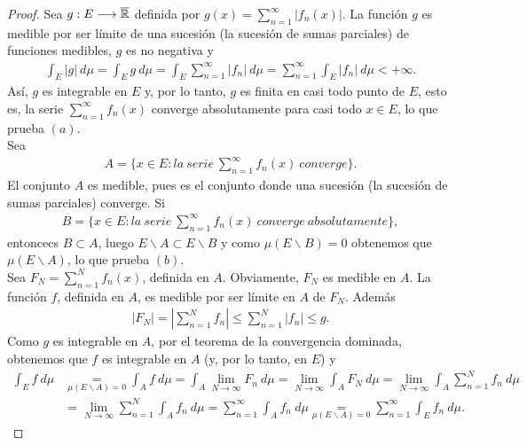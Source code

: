 \begin{proof}
Sea $g: E \longrightarrow \overline{\mathbb{R}}$ definida por $g(x) = \sum_{n=1}^{\infty}{|f_n(x)|}$. La función $g$ es medible por ser límite de una sucesión (la sucesión de sumas parciales) de funciones medibles, $g$ es no negativa y
\begin{align*}
    \int_{E}{|g| \ d\mu} = \int_{E}{g \ d\mu} = \int_{E}{\sum_{n=1}^{\infty}{|f_n|} \ d\mu} =  \sum_{n=1}^{\infty}{\int_{E}{|f_n| \ d\mu}} < +\infty.
\end{align*}
Así, $g$ es integrable en $E$ y, por lo tanto, $g$ es finita en casi todo punto de $E$, esto es, la serie $\sum_{n=1}^{\infty}{f_n(x)}$ converge absolutamente para casi todo $x \in E$, lo que prueba $(a)$.
\\
\newline
Sea
\begin{align*}
    A = \{ x \in E : la \ serie \ \sum_{n=1}^{\infty}{f_n(x)} \ converge\}.
\end{align*}
El conjunto $A$ es medible, pues es el conjunto donde una sucesión (la sucesión de sumas parciales) converge. Si
\begin{align*}
    B = \{ x \in E : la \ serie \ \sum_{n=1}^{\infty}{f_n(x)} \ converge \ absolutamente\},
\end{align*}
entoncecs $B \subset A$, luego $E \backslash A \subset E \backslash B$ y como $\mu(E \backslash B) = 0$ obtenemos que $\mu(E \backslash A)$, lo que prueba $(b)$.
\\
\newline
Sea $F_N = \sum_{n=1}^{N}{f_n(x)}$, definida en $A$. Obviamente, $F_N$ es medible en $A$. La función $f$, definida en $A$, es medible por ser límite en $A$ de $F_N$. Además
\begin{align*}
    |F_N| = |\sum_{n=1}^{N}{f_n}| \leq \sum_{n=1}^{N}{|f_n|} \leq g.
\end{align*}
Como $g$ es integrable en $A$, por el teorema de la convergencia dominada, obtenemos que $f$ es integrable en $A$ (y, por lo tanto, en $E$) y 
\begin{align*}
    \int_{E}{f \ d\mu} &\underset{\mu(E \backslash A) = 0}{=} \int_{A}{f \ d\mu} = \int_{A}{\lim_{N \to \infty}{F_n} \ d\mu} = \lim_{N \to \infty}{\int_{A}{F_N \ d\mu}} = \lim_{N \to \infty}{\int_{A}}{\sum_{n=1}^{N}{f_n} \ d\mu}\\
    &= \lim_{N \to \infty}{\sum_{n = 1}^{N}{\int_{A}{f_n} \ d\mu}} = {\sum_{n = 1}^{\infty}{\int_{A}{f_n} \ d\mu}} \underset{\mu(E \backslash A) = 0}{=} {\sum_{n = 1}^{\infty}{\int_{E}{f_n} \ d\mu}}.
\end{align*}
\end{proof}

